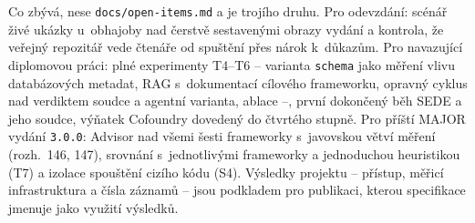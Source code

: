 \documentclass{article}
\begin{document}
Co zbývá, nese \texttt{docs/open-items.md} a je trojího druhu. Pro odevzdání: scénář živé ukázky u~obhajoby nad čerstvě sestavenými obrazy vydání a kontrola, že veřejný repozitář vede čtenáře od spuštění přes nárok k~důkazům. Pro navazující diplomovou práci: plné experimenty T4--T6 -- varianta \texttt{schema} jako měření vlivu databázových metadat, RAG s~dokumentací cílového frameworku, opravný cyklus nad verdiktem soudce a agentní varianta, ablace --, první dokončený běh SEDE a jeho soudce, výňatek Cofoundry dovedený do čtvrtého stupně. Pro příští MAJOR vydání \texttt{3.0.0}: Advisor nad všemi šesti frameworky s~javovskou větví měření (rozh.~146, 147), srovnání s~jednotlivými frameworky a jednoduchou heuristikou (T7) a izolace spouštění cizího kódu (S4). Výsledky projektu -- přístup, měřicí infrastruktura a čísla záznamů -- jsou podkladem pro publikaci, kterou specifikace jmenuje jako využití výsledků.
\end{document}
